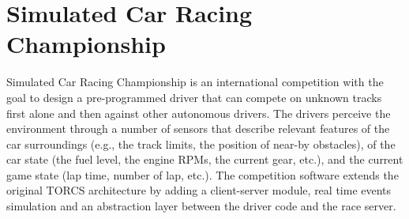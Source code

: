 \documentclass[Lau,oneside,noexaminfo]{sapthesis} %
\begin{document}
\section{Simulated Car Racing Championship}
\label{SCR}
Simulated Car Racing Championship is an international competition with the goal to design a pre-programmed driver that can compete on unknown tracks first alone and then against other autonomous drivers.\newline
The drivers perceive the environment through a number of sensors that describe relevant features of the car surroundings (e.g., the track limits, the position of near-by obstacles), of the car state (the fuel level, the engine RPMs, the current gear, etc.), and the current game state (lap time, number of lap, etc.).\newline
The competition software extends the original TORCS architecture by adding a client-server module, real time events simulation and an abstraction layer between the driver code and the race server. \cite{SCR}\newline
\end{document}
